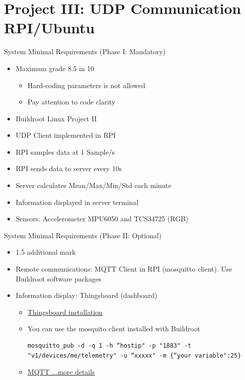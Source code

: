 \section{Project III: UDP Communication RPI/Ubuntu}
\begin{frame}{System Minimal Requirements (Phase I: Mandatory)}
    \begin{itemize}
        \item Maximum grade 8.5 in 10
            \begin{itemize}
                \item Hard-coding parameters is not allowed
                \item Pay attention to code clarity
            \end{itemize}
        \item Buildroot Linux Project II
        \item UDP Client implemented in RPI
        \item RPI samples data at 1 Sample/s
        \item RPI sends data to server every 10s
        \item Server calculates Mean/Max/Min/Std each minute
        \item Information displayed in server terminal
         \item Sensors: Accelerometer MPU6050 and TCS34725 (RGB)
    \end{itemize}
\end{frame}

\begin{frame}[fragile]{System Minimal Requirements (Phase II: Optional)}
    \begin{itemize} 
        \item 1.5 additional mark 
        \item Remote communications: MQTT Client in RPI (mosquitto client). Use Buildroot software packages
        \item Information display: Thingsboard (dashboard)
            \begin{itemize}
                \item \href {https://thingsboard.io/docs/user-guide/install/ubuntu/}{Thingsboard installation }
                \item You can use the mosquito client installed with Buildroot
                \begin{verbatim}
mosquitto_pub -d -q 1 -h “hostip" -p "1883" -t "v1/devices/me/telemetry" -u “xxxxx" -m {“your variable":25}
                \end{verbatim}
                \item \href{https://thingsboard.io/docs/getting-started-guides/helloworld/?connectdevice=mqtt-linux}{MQTT ...more details}

            \end{itemize}
    \end{itemize}
\end{frame}

